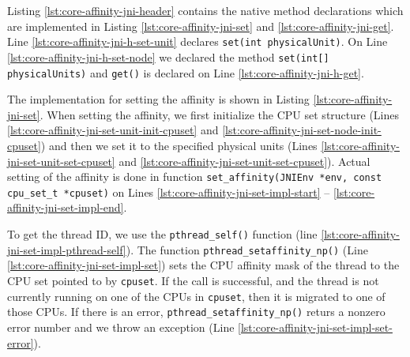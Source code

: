 

Listing \ref{lst:core-affinity-jni-header} contains the native method
declarations which are implemented in Listing
\ref{lst:core-affinity-jni-set} and
\ref{lst:core-affinity-jni-get}. Line
\ref{lst:core-affinity-jni-h-set-unit} declares
\lstinline!set(int physicalUnit)!. On Line
\ref{lst:core-affinity-jni-h-set-node} we declared the method
\lstinline!set(int[] physicalUnits)! and \lstinline!get()! is declared
on Line \ref{lst:core-affinity-jni-h-get}.



\newpage



\newpage

The implementation for setting the affinity is shown in Listing
\ref{lst:core-affinity-jni-set}. When setting the affinity, we first
initialize the CPU set structure (Lines
\ref{lst:core-affinity-jni-set-unit-init-cpuset} and
\ref{lst:core-affinity-jni-set-node-init-cpuset}) and then we set it
to the specified physical units (Lines
\ref{lst:core-affinity-jni-set-unit-set-cpuset} and
\ref{lst:core-affinity-jni-set-unit-set-cpuset}). Actual setting of
the affinity is done in function
\lstinline!set_affinity(JNIEnv *env, const cpu_set_t *cpuset)! on Lines
\ref{lst:core-affinity-jni-set-impl-start} --
\ref{lst:core-affinity-jni-set-impl-end}.

To get the thread ID, we use the \lstinline!pthread_self()! function
(line \ref{lst:core-affinity-jni-set-impl-pthread-self}). The function
\lstinline!pthread_setaffinity_np()! (Line
\ref{lst:core-affinity-jni-set-impl-set}) sets the CPU affinity mask
of the thread to the CPU set pointed to by \lstinline!cpuset!.  If the
call is successful, and the thread is not currently running on one of
the CPUs in \lstinline!cpuset!, then it is migrated to one of those
CPUs. If there is an error, \lstinline!pthread_setaffinity_np()!
returs a nonzero error number and we throw an exception (Line
\ref{lst:core-affinity-jni-set-impl-set-error}).

